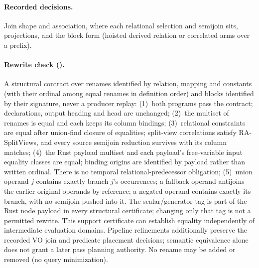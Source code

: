 \paragraph{Recorded decisions.} Join shape and association, where each relational
selection and semijoin sits, projections, and the block form (hoisted derived
relation or correlated arms over a prefix).

\paragraph{Rewrite check ().} A structural contract
over renames identified by relation, mapping and constants (with their
ordinal among equal renames in definition order) and blocks identified by
their signature, never a producer replay:
(1)~both programs pass the contract; declarations, output heading and head are
unchanged;
(2)~the multiset of renames is equal and each keeps its column bindings;
(3)~relational constraints are equal after union-find closure of equalities;
split-view correlations satisfy RA-SplitViews, and every source semijoin reduction survives
with its column matches;
(4)~the Rust payload multiset and each payload's free-variable input equality
classes are equal; binding origins are identified by payload rather than
written ordinal. There is no temporal relational-predecessor obligation;
(5)~union operand $j$ contains exactly branch $j$'s occurrences; a fallback
operand antijoins the earlier original operands by reference; a negated operand
contains exactly its branch, with no semijoin pushed into it.
The scalar/generator tag is part of the Rust node payload in every structural
certificate; changing only that tag is not a permitted rewrite.
This support certificate can establish equality independently of intermediate
evaluation domains. Pipeline refinements additionally preserve the recorded
VO join and predicate placement decisions; semantic equivalence alone does
not grant a later pass planning authority. No rename may be added or
removed (no query minimization).

